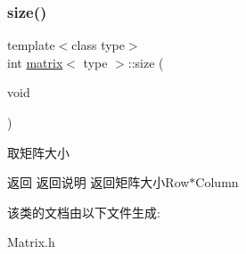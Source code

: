 \subsubsection{\texorpdfstring{size()}{size()}}
{\footnotesize\ttfamily template$<$class type$>$ \\
int \mbox{\hyperlink{classmatrix}{matrix}}$<$ type $>$\+::size (\begin{DoxyParamCaption}\item[{void}]{ }\end{DoxyParamCaption})\hspace{0.3cm}{\ttfamily [inline]}}



取矩阵大小 

\begin{DoxyReturn}{返回}
返回说明 返回矩阵大小\+Row$\ast$\+Column 
\end{DoxyReturn}


该类的文档由以下文件生成\+:\begin{DoxyCompactItemize}
\item 
Matrix.\+h\end{DoxyCompactItemize}
